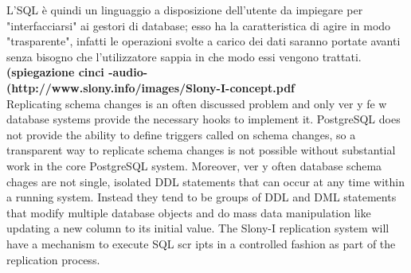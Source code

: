 L'SQL è quindi un linguaggio a disposizione dell'utente da impiegare per "interfacciarsi" ai gestori di database; esso ha la caratteristica di agire in modo "trasparente", infatti le operazioni svolte a carico dei dati saranno portate avanti senza bisogno che l'utilizzatore sappia in che modo essi vengono trattati.\\
\textbf{(spiegazione cinci -audio-}\\
\textbf{(http://www.slony.info/images/Slony-I-concept.pdf}\\
Replicating schema changes is an often discussed problem and only ver y
fe w database systems provide the necessary hooks to implement it. PostgreSQL
does not provide the ability to define triggers called on schema changes, so a
transparent way to replicate schema changes is not possible without substantial
work in the core PostgreSQL system.
Moreover, ver y often database schema chages are not single, isolated DDL
statements that can occur at any time within a running system. Instead they tend
to be groups of DDL and DML statements that modify multiple database objects
and do mass data manipulation like updating a new column to its initial value.
The Slony-I replication system will have a mechanism to execute SQL
scr ipts in a controlled fashion as part of the replication process.


